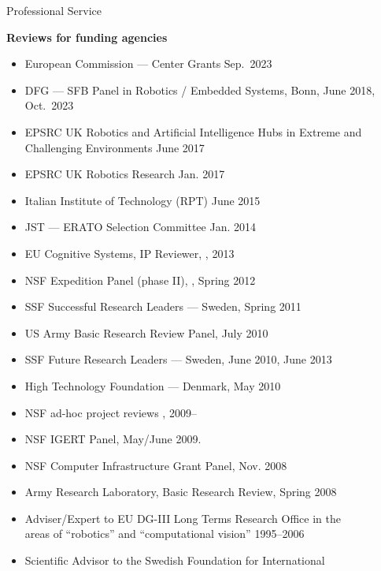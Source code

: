 \documentclass{article}
\begin{document}
\begin{cv}
\begin{cvlist}{Professional Service}
		\item {\bf Reviews for funding agencies}
		\begin{itemize}
			\item European Commission --- Center Grants \cftdotfill{\cftdotsep} Sep.~2023
			\item DFG --- SFB Panel in Robotics / Embedded Systems,
			      Bonn,\cftdotfill{\cftdotsep} June 2018, Oct.~2023
			\item EPSRC UK Robotics and Artificial Intelligence Hubs in Extreme
			      and Challenging Environments \cftdotfill{\cftdotsep} June 2017
			\item EPSRC UK Robotics Research  \cftdotfill{\cftdotsep} Jan. 2017
			\item Italian Institute of Technology (RPT) \cftdotfill{\cftdotsep}
			      June 2015
			\item JST --- ERATO Selection Committee \cftdotfill{\cftdotsep} Jan. 2014
			\item EU Cognitive Systems, IP Reviewer, \cftdotfill{\cftdotsep}, 2013
			\item NSF Expedition Panel (phase II), \cftdotfill{\cftdotsep},
			      Spring 2012
			\item SSF Successful Research Leaders --- Sweden,
			      \cftdotfill{\cftdotsep} Spring 2011
			\item US Army Basic Research Review Panel, \cftdotfill{\cftdotsep} July 2010
			\item SSF Future Research Leaders --- Sweden, \cftdotfill{\cftdotsep} June 2010, June 2013
			\item High Technology Foundation --- Denmark, \cftdotfill{\cftdotsep}  May 2010
			\item NSF ad-hoc project reviews \cftdotfill{\cftdotsep}, 2009--
			\item NSF IGERT Panel, \cftdotfill{\cftdotsep} May/June 2009.
			\item NSF Computer Infrastructure Grant Panel,  \cftdotfill{\cftdotsep} Nov. 2008
			\item Army Research Laboratory, Basic Research Review, \cftdotfill{\cftdotsep}  Spring 2008
			\item Adviser/Expert to EU DG-III Long Terms Research Office in the\\
			      areas of ``robotics'' and ``computational vision''
			      \cftdotfill{\cftdotsep}  1995--2006
			\item Scientific Advisor to the Swedish Foundation for International\\

\end{itemize}
\end{cvlist}
\end{cv}
\end{document}
